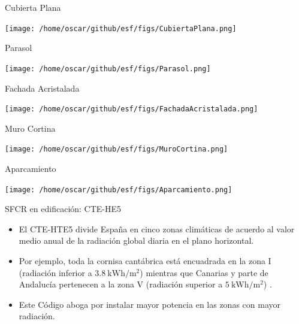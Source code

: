 \documentclass[xcolor={usenames,svgnames,dvipsnames}]{beamer}
\begin{document}
\begin{frame}[label={sec:orga5c90d2}]{Cubierta Plana}
\begin{center}
\texttt{[image: /home/oscar/github/esf/figs/CubiertaPlana.png]}
\end{center}
\end{frame}

\begin{frame}[label={sec:orgf584a8b}]{Parasol}
\begin{center}
\texttt{[image: /home/oscar/github/esf/figs/Parasol.png]}
\end{center}
\end{frame}

\begin{frame}[label={sec:org31e94ff}]{Fachada Acristalada}
\begin{center}
\texttt{[image: /home/oscar/github/esf/figs/FachadaAcristalada.png]}
\end{center}
\end{frame}

\begin{frame}[label={sec:org2932d8d}]{Muro Cortina}
\begin{center}
\texttt{[image: /home/oscar/github/esf/figs/MuroCortina.png]}
\end{center}
\end{frame}

\begin{frame}[label={sec:org9c1123e}]{Aparcamiento}
\begin{center}
\texttt{[image: /home/oscar/github/esf/figs/Aparcamiento.png]}
\end{center}
\end{frame}


\begin{frame}[label={sec:org8863d97}]{SFCR en edificación: CTE-HE5}
\begin{itemize}
\item El CTE-HTE5 divide España en cinco zonas climáticas de acuerdo al valor medio anual de la radiación global diaria en el plano horizontal.

\item Por ejemplo, toda la cornisa cantábrica está encuadrada en la zona I (radiación inferior a \(\SI{3.8}{\kWh\per\meter\squared}\)) mientras que Canarias y parte de Andalucía pertenecen a la zona V (radiación superior a \(\SI{5}{\kWh\per\meter\squared}\)) .

\item Este Código aboga por instalar mayor potencia en las zonas con mayor radiación.
\end{itemize}
\end{frame}
\end{document}

